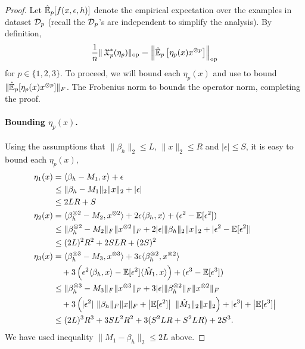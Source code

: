 \begin{proof}
Let $\hat{\operatorname{\mathbb{E}}}_p[f(x,\epsilon,h)]$ denote the empirical expectation over
the examples in dataset $\mathcal{D}_p$ (recall the $\mathcal{D}_p$'s are independent to
simplify the analysis).  By definition,
$$\frac1n \|\operatorname{\mathfrak{X}}_p^*(\eta_p)\|_{\text{\rm op}} = \left\| \hat{\operatorname{\mathbb{E}}}_p \left[\eta_p(x) x^{\otimes p} \right] \right\|_{\text{\rm op}} $$
for $p \in \{1,2,3\}$. To proceed, we will bound each $\eta_p(x)$
\iftoggle{withappendix}{}{
, defined in \refeqn{app:eta1}, \refeqn{app:eta2} and \refeqn{app:eta3},} and use  to bound $\|
\hat{\operatorname{\mathbb{E}}}_p[\eta_p(x) x^{\otimes p}] \|_F$. The Frobenius norm to bounds the
operator norm, completing the proof.


\paragraph{Bounding $\eta_p(x)$.}
Using the assumptions that $\|\beta_h\|_2 \le L$, $\|x\|_2 \le R$ and
$|\epsilon| \le S$, it is easy to bound each $\eta_p(x)$,
\begin{align*}
  \eta_1(x) &= \langle \beta_h - M_1, x \rangle + \epsilon \\
            &\le \|\beta_h - M_1\|_2 \|x\|_2 + |\epsilon| \\
            &\le 2LR + S \\
  \eta_2(x) 
    &= \langle \beta_h^{\otimes 2} - M_2, x^{\otimes 2} \rangle + 2 \epsilon \langle \beta_h, x \rangle + (\epsilon^2 - \operatorname{\mathbb{E}}[\epsilon^2]) \\
    &\le \|\beta_h^{\otimes 2} - M_2\|_F \|x^{\otimes 2}\|_F + 2 |\epsilon| \|\beta_h\|_2\|x\|_2 + |\epsilon^2 - \operatorname{\mathbb{E}}[\epsilon^2]| \\
    &\le (2L)^2 R^2 + 2 S L R + (2S)^2 \\
  \eta_3(x) &= \langle \beta_h^{\otimes 3} - M_3, x^{\otimes 3} \rangle
        + 3 \epsilon \langle \beta_h^{\otimes 2}, x^{\otimes 2} \rangle \\
        &\quad + 3\left(\epsilon^2 \langle \beta_h, x \rangle - \operatorname{\mathbb{E}}[\epsilon^2] \langle \hat M_1, x \rangle\right)
        + (\epsilon^3 - \operatorname{\mathbb{E}}[\epsilon^3]) \\
  &\le \|\beta_h^{\otimes 3} - M_3\|_F\|x^{\otimes 3}\|_F
        + 3 |\epsilon| \|\beta_h^{\otimes 2}\|_F \|x^{\otimes 2}\|_F  \\
        &\quad + 3 \left( |\epsilon^2|~\|\beta_h\|_F\|x\|_F + \left|\operatorname{\mathbb{E}}[\epsilon^2]\right|~\|\hat M_1\|_2\|x\|_2 \right)
        + |\epsilon^3| + \left| \operatorname{\mathbb{E}}[\epsilon^3] \right| \\
  &\le (2L)^3 R^3 + 3 S L^2 R^2 + 3 ( S^2 L R + S^2 L R ) + 2S^3.
\end{align*}
We have used inequality $\|M_1 - \beta_h\|_2 \le 2L$ above. 


\end{proof}

